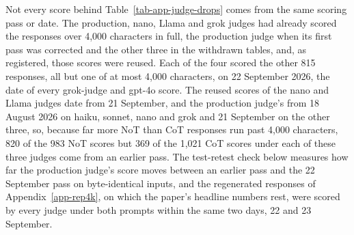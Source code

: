 Not every score behind Table~\ref{tab-app-judge-drops} comes from the same
scoring pass or date.
The production, nano, Llama and grok judges had already scored the responses
over 4,000 characters in full, the production judge when its first pass was
corrected and the other three in the withdrawn tables, and, as registered,
those scores were reused.
Each of the four scored the other 815 responses, all but one of at most 4,000
characters, on 22 September 2026, the date of every grok-judge and gpt-4o
score.
The reused scores of the nano and Llama judges date from 21 September, and
the production judge's from 18 August 2026 on haiku, sonnet, nano and grok
and 21 September on the other three, so, because far more NoT than CoT
responses run past 4,000 characters, 820 of the 983 NoT scores but 369 of the
1,021 CoT scores under each of these three judges come from an earlier pass.
The test-retest check below measures how far the production judge's score
moves between an earlier pass and the 22 September pass on byte-identical
inputs, and the regenerated responses of Appendix~\ref{app-rep4k}, on which
the paper's headline numbers rest, were scored by every judge under both prompts within the
same two days, 22 and 23 September.

